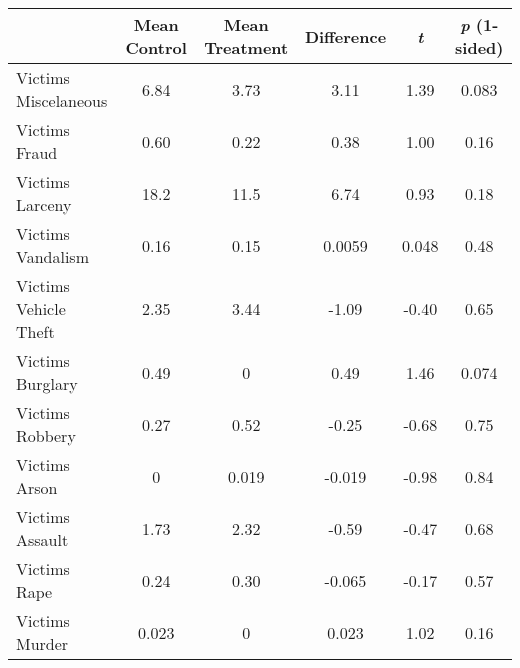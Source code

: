{
\def\sym#1{\ifmmode^{#1}\else\(^{#1}\)\fi}
\begin{tabular}{l*{1}{ccccc}}
\hline\hline
                    &Mean Control&Mean Treatment&  Difference&  \textit{t}&\textit{p} (1-sided)\\
\hline
Victims Miscelaneous &        6.84&        3.73&        3.11&        1.39&       0.083\\
Victims Fraud       &        0.60&        0.22&        0.38&        1.00&        0.16\\
Victims Larceny     &        18.2&        11.5&        6.74&        0.93&        0.18\\
Victims Vandalism   &        0.16&        0.15&      0.0059&       0.048&        0.48\\
Victims Vehicle Theft &        2.35&        3.44&       -1.09&       -0.40&        0.65\\
Victims Burglary    &        0.49&           0&        0.49&        1.46&       0.074\\
Victims Robbery     &        0.27&        0.52&       -0.25&       -0.68&        0.75\\
Victims Arson       &           0&       0.019&      -0.019&       -0.98&        0.84\\
Victims Assault     &        1.73&        2.32&       -0.59&       -0.47&        0.68\\
Victims Rape        &        0.24&        0.30&      -0.065&       -0.17&        0.57\\
Victims Murder      &       0.023&           0&       0.023&        1.02&        0.16\\
\hline\hline
\end{tabular}
}
